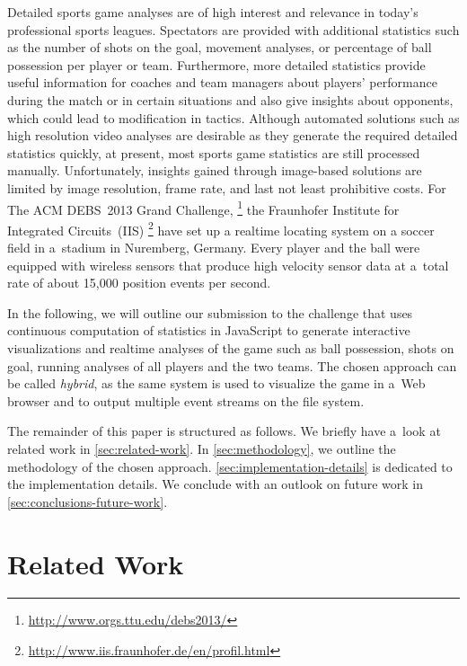 \documentclass{sig-alternate}
\newcommand{\inlinelistingsize}{\fontsize{8pt}{11pt}}
\let\oldurl\url
\renewcommand{\url}[1]{\inlinelistingsize\oldurl{#1}}
\begin{document}
Detailed sports game analyses are of high interest and
relevance in today’s professional sports leagues.
Spectators are provided with additional statistics
such as the number of shots on the goal, movement analyses,
or percentage of ball possession per player or team.
Furthermore, more detailed statistics provide useful information
for coaches and team managers about players' performance
during the match or in certain situations
and also give insights about opponents,
which could lead to modification in tactics.
Although automated solutions
such as high resolution video analyses are desirable
as they generate the required detailed statistics quickly,
at present, most sports game statistics are still processed manually.
Unfortunately, insights gained through image-based solutions
are limited by image resolution, frame rate, and last not least
prohibitive costs.
For The ACM DEBS~2013 Grand Challenge,%
\footnote{\url{http://www.orgs.ttu.edu/debs2013/}}
the Fraunhofer Institute for Integrated Circuits~(IIS)%
\footnote{\url{http://www.iis.fraunhofer.de/en/profil.html}}
have set up a realtime locating system on a soccer field
in a~stadium in Nuremberg, Germany.
Every player and the ball were equipped with wireless sensors
that produce high velocity sensor data at a~total rate
of about 15,000 position events per second.

In the following, we will outline our submission to the challenge
that uses continuous computation of statistics in JavaScript
to generate interactive visualizations and realtime analyses
of the game such as ball possession, shots on goal,
running analyses of all players and the two teams.
The chosen approach can be called \emph{hybrid},
as the same system is used to visualize the game in a~Web browser
and to output multiple event streams on the file system.

The remainder of this paper is structured as follows.
We briefly have a~look at related work in \autoref{sec:related-work}.
In \autoref{sec:methodology}, we outline
the methodology of the chosen approach.
\autoref{sec:implementation-details}
is dedicated to the implementation details.
We conclude with an outlook on future work in \autoref{sec:conclusions-future-work}.

\section{Related Work}
\label{sec:related-work}
\end{document}
